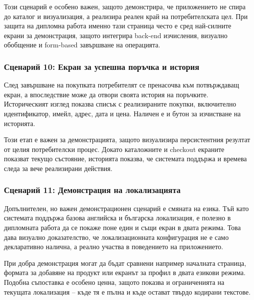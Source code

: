 Този сценарий е особено важен, защото демонстрира, че приложението не спира до каталог и визуализация, а реализира реален край на потребителската цел. При защита на дипломна работа именно тази страница често е сред най-силните екрани за демонстрация, защото интегрира back-end изчисления, визуално обобщение и form-based завършване на операцията.


\subsubsection{Сценарий 10: Екран за успешна поръчка и история}

След завършване на покупката потребителят се пренасочва към потвърждаващ екран, а впоследствие може да отвори своята история на поръчките. Историческият изглед показва списък с реализираните покупки, включително идентификатор, имейл, адрес, дата и цена. Наличен е и бутон за изчистване на историята.

Този етап е важен за демонстрацията, защото визуализира персистентния резултат от целия потребителски процес. Докато каталожните и checkout екраните показват текущо състояние, историята показва, че системата поддържа и времева следа за вече реализирани действия.


\subsubsection{Сценарий 11: Демонстрация на локализацията}

Допълнителен, но важен демонстрационен сценарий е смяната на езика. Тъй като системата поддържа базова английска и българска локализация, е полезно в дипломната работа да се покаже поне един и същи екран в двата режима. Това дава визуално доказателство, че локализационната конфигурация не е само декларативно налична, а реално участва в поведението на приложението.

При добра демонстрация могат да бъдат сравнени например началната страница, формата за добавяне на продукт или екранът за профил в двата езикови режима. Подобна съпоставка е особено ценна, защото показва и ограниченията на текущата локализация -- къде тя е пълна и къде остават твърдо кодирани текстове.


